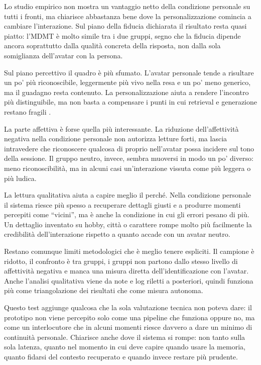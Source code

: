 Lo studio empirico non mostra un vantaggio netto della condizione personale su tutti i fronti, ma chiarisce abbastanza bene dove la personalizzazione comincia a cambiare l'interazione. Sul piano della fiducia dichiarata il risultato resta quasi piatto: l'MDMT è molto simile tra i due gruppi, segno che la fiducia dipende ancora soprattutto dalla qualità concreta della risposta, non dalla sola somiglianza dell'avatar con la persona.

Sul piano percettivo il quadro è più sfumato. L'avatar personale tende a risultare un po' più riconoscibile, leggermente più vivo nella resa e un po' meno generico, ma il guadagno resta contenuto. La personalizzazione aiuta a rendere l'incontro più distinguibile, ma non basta a compensare i punti in cui retrieval e generazione restano fragili \cite{Yang2025ECA_XR,Kan2023ECA_Training}.

La parte affettiva è forse quella più interessante. La riduzione dell'affettività negativa nella condizione personale non autorizza letture forti, ma lascia intravedere che riconoscere qualcosa di proprio nell'avatar possa incidere sul tono della sessione. Il gruppo neutro, invece, sembra muoversi in modo un po' diverso: meno riconoscibilità, ma in alcuni casi un'interazione vissuta come più leggera o più ludica.

La lettura qualitativa aiuta a capire meglio il perché. Nella condizione personale il sistema riesce più spesso a recuperare dettagli giusti e a produrre momenti percepiti come ``vicini'', ma è anche la condizione in cui gli errori pesano di più. Un dettaglio inventato su hobby, città o carattere rompe molto più facilmente la credibilità dell'interazione rispetto a quanto accade con un avatar neutro.

Restano comunque limiti metodologici che è meglio tenere espliciti. Il campione è ridotto, il confronto è tra gruppi, i gruppi non partono dallo stesso livello di affettività negativa e manca una misura diretta dell'identificazione con l'avatar. Anche l'analisi qualitativa viene da note e log riletti a posteriori, quindi funziona più come triangolazione dei risultati che come misura autonoma.

Questo test aggiunge qualcosa che la sola valutazione tecnica non poteva dare: il prototipo non viene percepito solo come una pipeline che funziona oppure no, ma come un interlocutore che in alcuni momenti riesce davvero a dare un minimo di continuità personale. Chiarisce anche dove il sistema si rompe: non tanto sulla sola latenza, quanto nel momento in cui deve capire quando usare la memoria, quanto fidarsi del contesto recuperato e quando invece restare più prudente.
